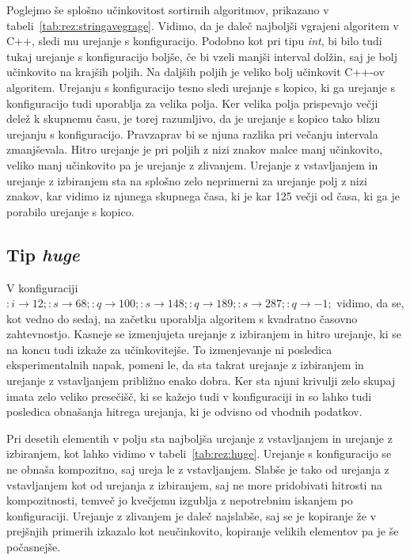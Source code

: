 \documentclass[a4paper,oneside,12pt]{article}
\newcommand{\lra}{\ensuremath{\longrightarrow}}
\begin{document}
Poglejmo še splošno učinkovitost sortirnih algoritmov, prikazano v
tabeli~\ref{tab:rez:stringavegrage}. Vidimo, da je daleč najboljši vgrajeni
algoritem v C++, sledi mu urejanje s konfiguracijo. Podobno kot pri tipu
\emph{int}, bi bilo tudi tukaj urejanje s konfiguracijo boljše, če bi vzeli
manjši interval dolžin, saj je bolj učinkovito na krajših poljih. Na daljših
poljih je veliko bolj učinkovit \mbox{C++-ov} algoritem. Urejanju s konfiguracijo tesno
sledi urejanje s kopico, ki ga urejanje s konfiguracijo tudi uporablja za velika
polja. Ker velika polja prispevajo večji delež k skupnemu času, je torej
razumljivo, da je urejanje s kopico tako blizu urejanju s konfiguracijo.
Pravzaprav bi se njuna razlika pri večanju intervala zmanjševala.
Hitro urejanje je pri poljih z nizi znakov malce manj učinkovito, veliko manj
učinkovito pa je urejanje z zlivanjem. Urejanje z vstavljanjem in urejanje z
izbiranjem sta na splošno zelo neprimerni za urejanje polj z nizi znakov, kar
vidimo iz njunega skupnega časa, ki je kar 125 večji od časa, ki ga je porabilo
urejanje s kopico.

\subsection{Tip \emph{huge}}
V konfiguraciji $:i \lra 12;:s \lra 68;:q \lra 100;:s \lra 148;:q \lra 189;:s
\lra 287;:q \lra -1;$ vidimo, da se, kot vedno do sedaj, na začetku uporablja algoritem s kvadratno
časovno zahtevnostjo. Kasneje se izmenjujeta urejanje z izbiranjem in hitro
urejanje, ki se na koncu tudi izkaže za učinkovitejše. To izmenjevanje ni
posledica eksperimentalnih napak, pomeni le, da sta takrat urejanje z izbiranjem
in urejanje z vstavljanjem približno enako dobra. Ker sta njuni krivulji zelo
skupaj imata zelo veliko presečišč, ki se kažejo tudi v konfiguraciji in so lahko
tudi posledica obnašanja hitrega urejanja, ki je odvisno od vhodnih podatkov.

Pri desetih elementih v polju sta najboljša urejanje z vstavljanjem in urejanje
z izbiranjem, kot lahko vidimo v tabeli~\ref{tab:rez:huge}.
Urejanje s konfiguracijo se ne obnaša kompozitno, saj ureja le z
vstavljanjem. Slabše je tako od urejanja z vstavljanjem kot od urejanja z
izbiranjem, saj ne more pridobivati hitrosti na kompozitnosti, temveč jo
kvečjemu izgublja z nepotrebnim iskanjem po konfiguraciji. Urejanje z zlivanjem
je daleč najslabše, saj se je  kopiranje že v prejšnjih primerih izkazalo kot
neučinkovito, kopiranje velikih elementov pa je še počasnejše. 
\end{document}
